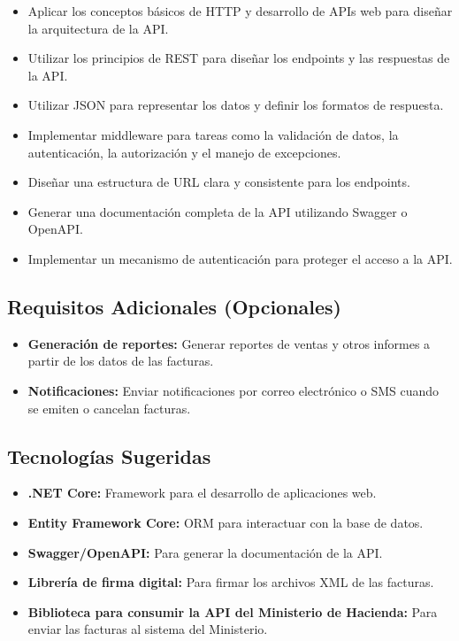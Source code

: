 \documentclass[
]{agujournal2019}
\providecommand{\tightlist}{%
  \setlength{\itemsep}{0pt}\setlength{\parskip}{0pt}}\usepackage{longtable,booktabs,array}
\begin{document}
\begin{itemize}
\tightlist
\item
  Aplicar los conceptos básicos de HTTP y desarrollo de APIs web para
  diseñar la arquitectura de la API.
\item
  Utilizar los principios de REST para diseñar los endpoints y las
  respuestas de la API.
\item
  Utilizar JSON para representar los datos y definir los formatos de
  respuesta.
\item
  Implementar middleware para tareas como la validación de datos, la
  autenticación, la autorización y el manejo de excepciones.
\item
  Diseñar una estructura de URL clara y consistente para los endpoints.
\item
  Generar una documentación completa de la API utilizando Swagger o
  OpenAPI.
\item
  Implementar un mecanismo de autenticación para proteger el acceso a la
  API.
\end{itemize}

\subsection{Requisitos Adicionales
(Opcionales)}\label{requisitos-adicionales-opcionales-1}

\begin{itemize}
\item
  \textbf{Generación de reportes:} Generar reportes de ventas y otros
  informes a partir de los datos de las facturas.
\item
  \textbf{Notificaciones:} Enviar notificaciones por correo electrónico
  o SMS cuando se emiten o cancelan facturas.
\end{itemize}

\subsection{Tecnologías Sugeridas}\label{tecnologuxedas-sugeridas-1}

\begin{itemize}
\item
  \textbf{.NET Core:} Framework para el desarrollo de aplicaciones web.
\item
  \textbf{Entity Framework Core:} ORM para interactuar con la base de
  datos.
\item
  \textbf{Swagger/OpenAPI:} Para generar la documentación de la API.
\item
  \textbf{Librería de firma digital:} Para firmar los archivos XML de
  las facturas.
\item
  \textbf{Biblioteca para consumir la API del Ministerio de Hacienda:}
  Para enviar las facturas al sistema del Ministerio.
\end{itemize}
\end{document}
